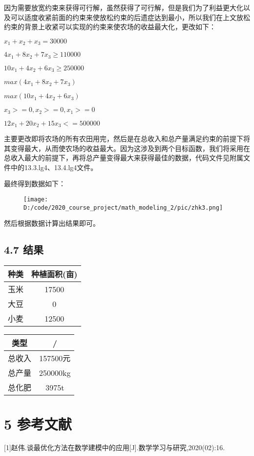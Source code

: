\documentclass[bachelor,openany,oneside,color]{buaathesis}
\begin{document}
因为需要放宽约束来获得可行解，虽然获得了可行解，但是我们为了利益更大化以及可以适度收紧前面的约束来使放松约束的后遗症达到最小，所以我们在上文放松约束的背景上收紧可以实现的约束来使农场的收益最大化，更改如下：

\(x_1+x_2+x_3=30000\)

\(4x_1+8x_2+7x_3\geq110000\)

\(10x_1+4x_2+6x_3\geq250000\)

\(max(4x_1+8x_2+7x_3)\)

\(max(10x_1+4x_2+6x_3)\)

\(x_3>=0,x_2>=0,x_1>=0\)

\(12x_1+20x_2+15x_3<=500000\)

主要更改即将农场的所有农田用完，然后是在总收入和总产量满足约束的前提下将其变得最大，从而使农场的收益最大。因为这涉及到两个目标函数，我们将采用在总收入最大的前提下，再将总产量变得最大来获得最佳的数据，代码文件见附属文件中的13.3.lg4、13.4.lg4文件。

最终得到数据如下：

\begin{figure}
\centering
\texttt{[image: D:/code/2020\_course\_project/math\_modeling\_2/pic/zhk3.png]}
\caption{}
\end{figure}

然后根据数据计算出结果即可。

\hypertarget{header-n378}{%
\section{4.7 结果}\label{header-n378}}

\begin{longtable}[]{@{}cc@{}}
\toprule
种类 & 种植面积(亩)\tabularnewline
\midrule
\endhead
玉米 & 17500\tabularnewline
大豆 & 0\tabularnewline
小麦 & 12500\tabularnewline
\bottomrule
\end{longtable}

\begin{longtable}[]{@{}cc@{}}
\toprule
类型 & /\tabularnewline
\midrule
\endhead
总收入 & 157500元\tabularnewline
总产量 & 250000kg\tabularnewline
总化肥 & 3975t\tabularnewline
\bottomrule
\end{longtable}

\hypertarget{header-n405}{%
\chapter{5 参考文献}\label{header-n405}}
\setcounter{table}{0}\setcounter{figure}{0}
{[}1{]}赵伟.谈最优化方法在数学建模中的应用{[}J{]}.数学学习与研究,2020(02):16.
\end{document}
